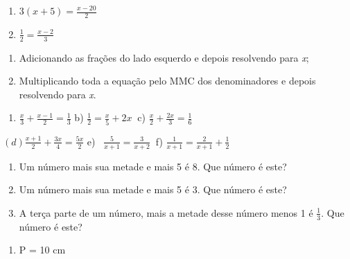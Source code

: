 \begin{exercicios}
\begin{enumerate}
	\item  \( 3 \left( x+5 \right) =\frac{x-20}{2} \)

	\item  \( \frac{1}{2}=\frac{x-2}{3} \)
\end{enumerate}


\begin{enumerate}
	\item Adicionando as frações do lado esquerdo e depois resolvendo para \textit{x};

	\item Multiplicando toda a equação pelo MMC dos denominadores e depois resolvendo para \textit{x}.
\end{enumerate}


\begin{enumerate}
	\item  \( \frac{x}{3}+\frac{x-1}{2}=\frac{1}{3} \) { b)  \( \frac{1}{2}=\frac{x}{5}+2x~  \) c)  \( \frac{x}{2}+\frac{2x}{3}=\frac{1}{6} \) }
\end{enumerate}

 \((d)  \frac{x+1}{2}+\frac{3x}{4}=\frac{5x}{2} \) { e)~  \( \frac{5}{x+1}=\frac{3}{x+2}~  \) f)  \( \frac{1}{x+1}=\frac{2}{x+1}+\frac{1}{2} \) }


\begin{enumerate}
	\item Um número mais sua metade e mais 5 é 8. Que número é este?

	\item Um número mais sua metade e mais 5 é 3. Que número é este?

	\item A terça parte de um número, mais a metade desse número menos 1 é $\frac{1}{3}$. Que número é este?
\end{enumerate}



\begin{enumerate}
	\item P = 10 cm


\end{enumerate}
\end{exercicios}
